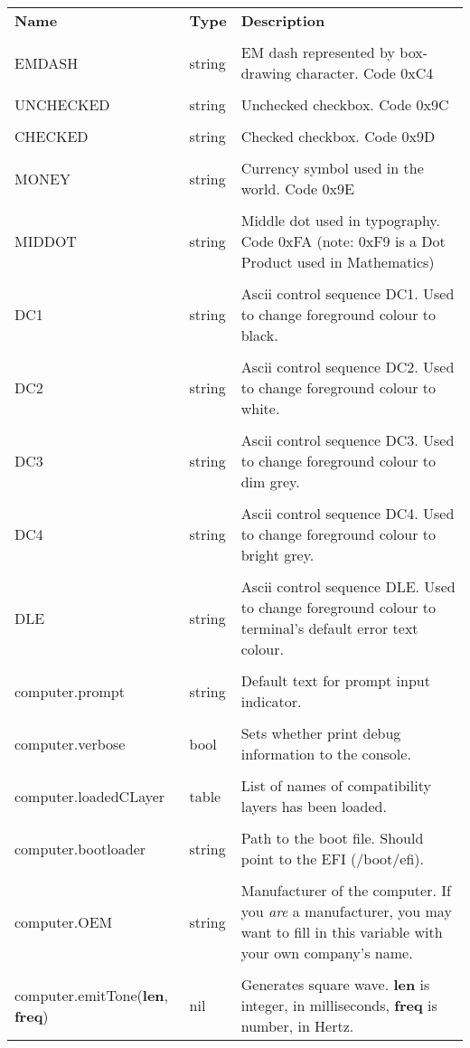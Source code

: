 \begin{tabularx}{\textwidth}{l l X}
	\textbf{\large Name} & \textbf{\large Type} & \textbf{\large Description}
	\\ \\
	\endhead
	\unemph{\_G.}EMDASH & string & EM dash represented by box-drawing character. Code 0xC4
	\\ \\
	\unemph{\_G.}UNCHECKED & string & Unchecked checkbox. Code 0x9C
	\\ \\
	\unemph{\_G.}CHECKED & string & Checked checkbox. Code 0x9D
	\\ \\
	\unemph{\_G.}MONEY & string & Currency symbol used in the world. Code 0x9E
	\\ \\
	\unemph{\_G.}MIDDOT & string & Middle dot used in typography. Code 0xFA (note: 0xF9 is a Dot Product used in Mathematics)
	\\ \\
	\unemph{\_G.}DC1 & string & Ascii control sequence DC1. Used to change foreground colour to black.
	\\ \\
	\unemph{\_G.}DC2 & string & Ascii control sequence DC2. Used to change foreground colour to white.
	\\ \\
	\unemph{\_G.}DC3 & string & Ascii control sequence DC3. Used to change foreground colour to dim grey.
	\\ \\
	\unemph{\_G.}DC4 & string & Ascii control sequence DC4. Used to change foreground colour to bright grey.
	\\ \\
	\unemph{\_G.}DLE & string & Ascii control sequence DLE. Used to change foreground colour to terminal's default error text colour.
	\\ \\
	computer.prompt & string & Default text for prompt input indicator.
	\\ \\
	computer.verbose & bool & Sets whether print debug information to the console.
	\\ \\
	computer.loadedCLayer & table & List of names of compatibility layers has been loaded.
	\\ \\
	computer.bootloader & string & Path to the boot file. Should point to the EFI (/boot/efi).
	\\ \\
	computer.OEM & string & Manufacturer of the computer. If you \emph{are} a manufacturer, you may want to fill in this variable with your own company's name.
	\\ \\
	computer.emitTone(\textbf{len}, \textbf{freq}) & nil & Generates square wave. \textbf{len} is integer, in milliseconds, \textbf{freq} is number, in Hertz.
\end{tabularx}


